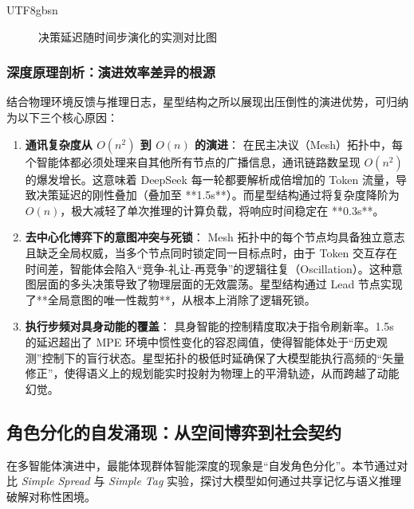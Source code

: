 \documentclass[11pt,a4paper]{article}
\begin{document}
\begin{CJK*}{UTF8}{gbsn}
\begin{figure}[h!]
\caption{决策延迟随时间步演化的实测对比图}
\end{figure}



\subsubsection{深度原理剖析：演进效率差异的根源}
结合物理环境反馈与推理日志，星型结构之所以展现出压倒性的演进优势，可归纳为以下三个核心原因：

\begin{enumerate}
    \item \textbf{通讯复杂度从 $O(n^2)$ 到 $O(n)$ 的演进}：
    在民主决议（Mesh）拓扑中，每个智能体都必须处理来自其他所有节点的广播信息，通讯链路数呈现 $O(n^2)$ 的爆发增长。这意味着 DeepSeek 每一轮都要解析成倍增加的 Token 流量，导致决策延迟的刚性叠加（叠加至 **1.5s**）。而星型结构通过将复杂度降阶为 $O(n)$，极大减轻了单次推理的计算负载，将响应时间稳定在 **0.3s**。
    
    \item \textbf{去中心化博弈下的意图冲突与死锁}：
    Mesh 拓扑中的每个节点均具备独立意志且缺乏全局权威，当多个节点同时锁定同一目标点时，由于 Token 交互存在时间差，智能体会陷入“竞争-礼让-再竞争”的逻辑往复（Oscillation）。这种意图层面的多头决策导致了物理层面的无效震荡。星型结构通过 Lead 节点实现了**全局意图的唯一性裁剪**，从根本上消除了逻辑死锁。
    
    \item \textbf{执行步频对具身动能的覆盖}：
    具身智能的控制精度取决于指令刷新率。1.5s 的延迟超出了 MPE 环境中惯性变化的容忍阈值，使得智能体处于“历史观测”控制下的盲行状态。星型拓扑的极低时延确保了大模型能执行高频的“矢量修正”，使得语义上的规划能实时投射为物理上的平滑轨迹，从而跨越了动能幻觉。
\end{enumerate}

\subsection{角色分化的自发涌现：从空间博弈到社会契约}
在多智能体演进中，最能体现群体智能深度的现象是“自发角色分化”。本节通过对比 \textit{Simple Spread} 与 \textit{Simple Tag} 实验，探讨大模型如何通过共享记忆与语义推理破解对称性困境。


\end{CJK*}
\end{document}
